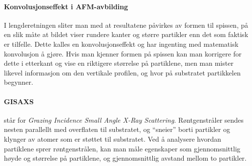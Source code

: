 \paragraph{Konvolusjonseffekt i AFM-avbilding} I lengderetningen sliter man med at resultatene påvirkes av formen til spissen, på en slik måte at bildet viser rundere kanter og større partikler enn det som faktisk er tilfelle. Dette kalles en konvolusjonseffekt og har ingenting med matematisk konvolusjon å gjøre. Hvis man kjenner formen på spissen kan man korrigere for dette i etterkant og vise en riktigere størrelse på partiklene, men man mister likevel informasjon om den vertikale profilen, og hvor på substratet partikkelen begynner.

\paragraph{GISAXS} står for \emph{Grazing Incidence Small Angle X-Ray Scattering}. Røntgenstråler sendes nesten parallellt med overflaten til substratet, og ``sneier'' borti partikler og klynger av atomer som er støttet til substratet. Ved å analysere hvordan partiklene sprer røntgenstrålen, kan man måle egenskaper som gjennomsnittlig høyde og størrelse på partiklene, og gjennomsnittlig avstand mellom to partikler.
